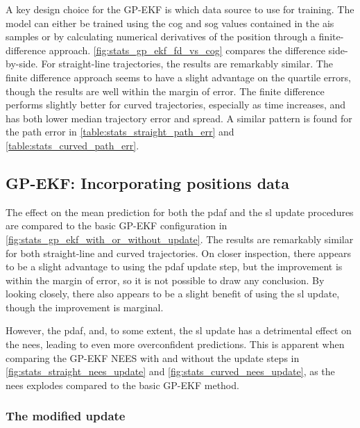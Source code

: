 A key design choice for the GP-EKF is which data source to use for training. The model can either be trained using the \acrshort{cog} and \acrshort{sog} values contained in the \acrshort{ais} samples or by calculating numerical derivatives of the position through a finite-difference approach. \cref{fig:stats_gp_ekf_fd_vs_cog} compares the difference side-by-side. For straight-line trajectories, the results are remarkably similar. The finite difference approach seems to have a slight advantage on the quartile errors, though the results are well within the margin of error. The finite difference performs slightly better for curved trajectories, especially as time increases, and has both lower median trajectory error and spread. A similar pattern is found for the path error in \cref{table:stats_straight_path_err} and \cref{table:stats_curved_path_err}.

\subsection{GP-EKF: Incorporating positions data}
The effect on the mean prediction for both the \acrshort{pdaf} and the \acrshort{sl} update procedures are compared to the basic GP-EKF configuration in \cref{fig:stats_gp_ekf_with_or_without_update}. The results are remarkably similar for both straight-line and curved trajectories. On closer inspection, there appears to be a slight advantage to using the \acrshort{pdaf} update step, but the improvement is within the margin of error, so it is not possible to draw any conclusion. By looking closely, there also appears to be a slight benefit of using the \acrshort{sl} update, though the improvement is marginal.

However, the \acrshort{pdaf}, and, to some extent, the \acrshort{sl} update has a detrimental effect on the \acrshort{nees}, leading to even more overconfident predictions. This is apparent when comparing the GP-EKF NEES with and without the update steps in \cref{fig:stats_straight_nees_update} and \cref{fig:stats_curved_nees_update}, as the \acrshort{nees} explodes compared to the basic GP-EKF method.










\subsubsection{The modified update}


